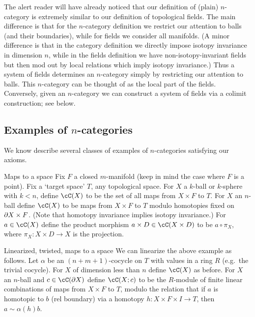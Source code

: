 \medskip

The alert reader will have already noticed that our definition of (plain) $n$-category
is extremely similar to our definition of topological fields.
The main difference is that for the $n$-category definition we restrict our attention to balls
(and their boundaries), while for fields we consider all manifolds.
(A minor difference is that in the category definition we directly impose isotopy
invariance in dimension $n$, while in the fields definition we have non-isotopy-invariant fields
but then mod out by local relations which imply isotopy invariance.)
Thus a system of fields determines an $n$-category simply by restricting our attention to
balls.
This $n$-category can be thought of as the local part of the fields.
Conversely, given an $n$-category we can construct a system of fields via 
a colimit construction; see below.


\medskip

\subsection{Examples of $n$-categories}


We know describe several classes of examples of $n$-categories satisfying our axioms.

\begin{example}{Maps to a space}
\label{ex:maps-to-a-space}%
Fix $F$ a closed $m$-manifold (keep in mind the case where $F$ is a point). Fix a `target space' $T$, any topological space.
For $X$ a $k$-ball or $k$-sphere with $k < n$, define $\cC(X)$ to be the set of 
all maps from $X\times F$ to $T$.
For $X$ an $n$-ball define $\cC(X)$ to be maps from $X\times F$ to $T$ modulo
homotopies fixed on $\partial X \times F$.
(Note that homotopy invariance implies isotopy invariance.)
For $a\in \cC(X)$ define the product morphism $a\times D \in \cC(X\times D)$ to
be $a\circ\pi_X$, where $\pi_X : X\times D \to X$ is the projection.
\end{example}

\begin{example}{Linearized, twisted, maps to a space}
\label{ex:linearized-maps-to-a-space}%
We can linearize the above example as follows.
Let $\alpha$ be an $(n{+}m{+}1)$-cocycle on $T$ with values in a ring $R$
(e.g.\ the trivial cocycle).
For $X$ of dimension less than $n$ define $\cC(X)$ as before.
For $X$ an $n$-ball and $c\in \cC(\bd X)$ define $\cC(X; c)$ to be
the $R$-module of finite linear combinations of maps from $X\times F$ to $T$,
modulo the relation that if $a$ is homotopic to $b$ (rel boundary) via a homotopy
$h: X\times F\times I \to T$, then $a \sim \alpha(h)b$.
\end{example}

